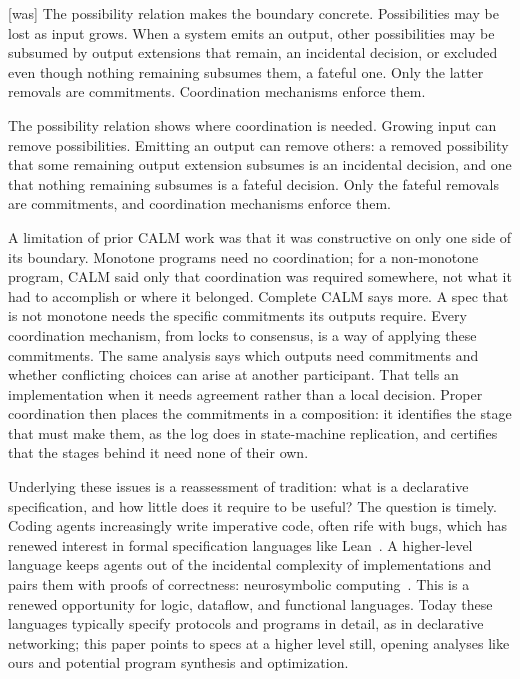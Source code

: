 \documentclass[sigconf]{cidr-2027}
\theoremstyle{remark}
\newcommand{\commitments}{commitments\xspace}
\begin{document}
{\footnotesize\color{black!50}\noindent\textsf{[was]} The possibility relation makes the boundary concrete.  Possibilities may
be lost as input grows.  When a system emits an output, other possibilities
may be subsumed by output extensions that remain, an incidental decision, or
excluded even though nothing remaining subsumes them, a fateful one.
Only the latter removals are \commitments.  Coordination mechanisms enforce
them.\par}

\color{blue!70!black}The possibility relation shows where coordination is needed.  Growing input can remove possibilities.  Emitting an output can remove others: a removed
possibility that some remaining output extension subsumes is an incidental
decision, and one that nothing remaining subsumes is a fateful decision.  Only
the fateful removals are \commitments, and coordination mechanisms enforce
them.\color{black}

A limitation of prior CALM work was that it was constructive on only one side of
its boundary.  Monotone programs need no coordination; for a non-monotone
program, CALM said only that coordination was required somewhere, not what it
had to accomplish or where it belonged.  Complete CALM says more.  A
spec that is not monotone needs the specific \commitments its outputs
require.  Every coordination mechanism, from locks to consensus, is a way of
applying these \commitments.  The same analysis says which outputs need
\commitments and whether conflicting choices can arise at another participant.
That tells an implementation when it needs agreement rather than a local
decision.  Proper coordination
then places the \commitments in a composition: it identifies the stage that
must make them, as the log does in state-machine replication, and certifies
that the stages behind it need none of their own.

Underlying these issues is a reassessment of
tradition: what is a declarative specification, and how little does it require
to be useful? The question is timely. Coding agents increasingly write
imperative code, often rife with bugs, which has renewed interest in formal
specification languages like Lean~\cite{demoura2021lean4}. A higher-level
language keeps agents out of the incidental complexity of implementations and
pairs them with proofs of correctness: neurosymbolic
computing~\cite{an2025neurosymbolic}. This is a renewed opportunity for logic,
dataflow, and functional languages. Today these languages typically specify
protocols and programs in detail, as in declarative networking; this paper
points to specs at a higher level still, opening analyses like ours and
potential program synthesis and optimization.
\end{document}
